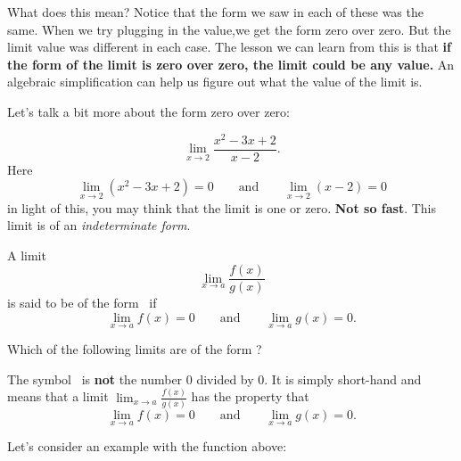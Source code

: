 \documentclass{ximera}
\begin{document}
What does this mean? Notice that the form we saw in each of these was the same. When we try plugging in the value,we get the form zero over zero. But the limit value was different in each case. The lesson we can learn from this is that \textbf{if the form of the limit is zero over zero, the limit could be any value.} An algebraic simplification can help us figure out what the value of the limit is.

Let's talk a bit more about the form zero over zero:

\[
\lim_{x\to 2}\frac{x^2-3x+2}{x-2}.
\]
Here 
\[
\lim_{x\to 2}\left(x^2-3x+2\right) = 0\qquad\text{and}\qquad \lim_{x\to
  2}\left(x-2\right) = 0
\]
in light of this, you may think that the limit is one or
zero. \textbf{Not so fast}. This limit is of an \textit{indeterminate
  form}. 

\begin{definition}
  A limit
  \[
  \lim_{x\to a} \frac{f(x)}{g(x)}
  \]
  is said to be of the form \zeroOverZero\ if
  \[
  \lim_{x\to a} f(x) = 0\qquad\text{and}\qquad \lim_{x\to a} g(x) =0.
  \]
\end{definition}

\begin{question}
  Which of the following limits are of the form \zeroOverZero?
  \begin{selectAll}
  \end{selectAll}
\end{question}

\begin{warning}
  The symbol \zeroOverZero\ is \textbf{not} the number $0$ divided by
  $0$. It is simply short-hand and means that a limit $\lim_{x\to a}
  \frac{f(x)}{g(x)}$ has the property that
  \[
  \lim_{x\to a} f(x) = 0\qquad\text{and}\qquad \lim_{x\to a} g(x) =0.
  \]
\end{warning}


Let's consider an example with the function above:
\end{document}

